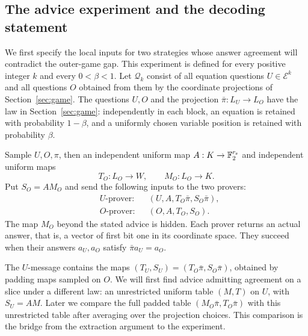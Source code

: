 \subsection{The advice experiment and the decoding statement}

We first specify the local inputs for two strategies whose answer agreement
will contradict the outer-game gap.  This experiment is defined for every positive integer $k$
and every $0<\beta<1$.  Let $\mathcal Q_k$ consist of all equation
questions $U\in\mathcal E^k$ and all questions $O$
obtained from them by the coordinate projections of Section~\ref{sec:game}.
The questions $U,O$ and the projection
$\bar\pi:L_U\to L_O$ have the law in Section~\ref{sec:game}: independently
in each block, an equation is retained with probability $1-\beta$, and a
uniformly chosen variable position is retained with probability $\beta$.

\begin{definition}
\label{def:projected-advice}
Sample $U,O,\pi$, then an independent uniform map
$A:K\to\mathbb F_2^{r_{\rm s}}$ and independent uniform maps
\[
 T_O:L_O\to W,\qquad M_O:L_O\to K.
\]
Put $S_O=AM_O$ and send the following inputs to the two provers:
\begin{equation}
 \begin{aligned}
  &\text{$U$-prover:}&& (U,A,T_O\bar\pi,S_O\bar\pi),\\
  &\text{$O$-prover:}&& (O,A,T_O,S_O).
 \end{aligned}
 \label{eq:projected-advice}
\end{equation}
The map $M_O$ beyond the stated advice is hidden.  Each prover returns an
actual answer, that is, a vector of first bit one in its coordinate
space.  They succeed when their answers $a_U,a_O$ satisfy
$\bar\pi a_U=a_O$.
\end{definition}

The $U$-message contains the maps
$(T_U,S_U)=(T_O\bar\pi,S_O\bar\pi)$, obtained by padding maps sampled
on $O$.  We will first find advice admitting agreement on a slice under a different law: an
unrestricted uniform table $(M,T)$ on $U$, with $S_U=AM$.  Later we
compare the full padded table $(M_O\bar\pi,T_O\bar\pi)$ with this
unrestricted table after averaging over the projection choices.  This
comparison is the bridge from the extraction argument to the experiment.

